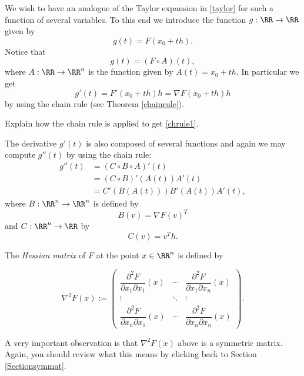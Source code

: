 \documentclass{article}
\begin{document}
We wish to have an analogue of the Taylor expansion in \eqref{taylor} for
such a function of several variables. To this end we introduce the function
$g:\RR\rightarrow \RR$ given by
\begin{equation}\label{onedimg}
g(t) = F(x_0 + t h).
\end{equation}
Notice that
$$
g(t) = (F\circ A)(t),
$$
where $A: \RR\rightarrow \RR^n$ is the function given by $A(t) = x_0 + t h$. In particular
we get
\begin{equation}\label{chrule1}
g'(t) = F'(x_0 + t h) h = \nabla F(x_0 + t h) h
\end{equation}
by using the chain rule (see Theorem \ref{chainrule}).

\beginshex
Explain how the chain rule is applied to get \eqref{chrule1}.
\endshex

The derivative $g'(t)$ is also composed of several functions and again we may
compute $g''(t)$ by using the chain rule:
\begin{align}
  g''(t) &= (C\circ B \circ A)'(t)\\
        &= (C\circ B)'(A(t)) A'(t) \\
        &= C'(B(A(t))) B'(A(t)) A'(t),
\end{align}
where $B: \RR^n\rightarrow \RR^n$ is defined by
$$
B(v) = \nabla F(v)^T
$$
and $C:\RR^n \rightarrow \RR$ by
$$
C(v) = v^T h.
$$

\begin{definition}[emph]

The \emph{Hessian matrix} of $F$ at the point
$x\in \RR^n$ is defined by

\begin{equation*}
  \nabla^2 F(x) :=
  \begin{pmatrix}
    \dfrac{ \partial^2 F}{ \partial x_1 \partial x_1}(x) &
    \cdots & \dfrac{ \partial^2 F}{ \partial x_1 \partial
      x_n}(x)
    \\
    \vdots & \ddots & \vdots
    \\
    \dfrac{ \partial^2 F}{ \partial x_n \partial x_1}(x) &
    \cdots & \dfrac{\partial^2 F}{ \partial x_n\partial
      x_n}(x)
  \end{pmatrix}
  .

\end{equation*}
\end{definition}



A very important observation is that $\nabla^2 F(x)$ above is a
symmetric matrix. Again, you should review what this means by clicking
back to Section \ref{Sectionsymmat}.
\end{document}
